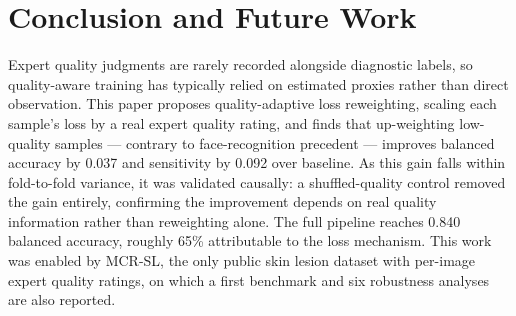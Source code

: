 \documentclass[conference]{IEEEtran}
\begin{document}
\section{Conclusion and Future Work}
Expert quality judgments are rarely recorded alongside diagnostic labels, so quality-aware training has typically relied on estimated proxies rather than direct observation. This paper proposes quality-adaptive loss reweighting, scaling each sample's loss by a real expert quality rating, and finds that up-weighting low-quality samples — contrary to face-recognition precedent — improves balanced accuracy by 0.037 and sensitivity by 0.092 over baseline. As this gain falls within fold-to-fold variance, it was validated causally: a shuffled-quality control removed the gain entirely, confirming the improvement depends on real quality information rather than reweighting alone. The full pipeline reaches 0.840 balanced accuracy, roughly 65\% attributable to the loss mechanism. This work was enabled by MCR-SL, the only public skin lesion dataset with per-image expert quality ratings, on which a first benchmark and six robustness analyses are also reported.
\end{document}
